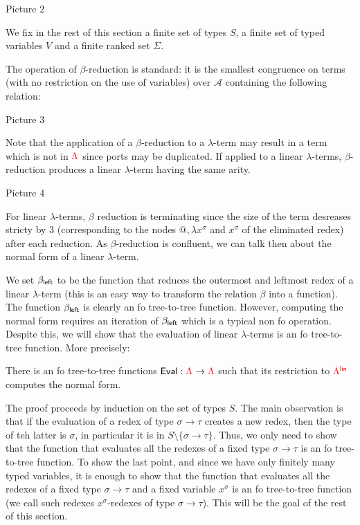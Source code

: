 \begin{center}
Picture 2
\end{center}


We fix in the rest of this section a finite set of types $S$, a finite set of typed variables $V$ and a finite  ranked set $\Sigma$.

 The operation of $\beta$-reduction is standard: it is the smallest congruence on terms (with no restriction on the use of variables) over $\mathcal{A}$ containing the following relation:
 \begin{center}
 Picture 3
 \end{center}
Note that the application of a $\beta$-reduction to a $\lambda$-term may result in a term which is not in ${\color{red}{\Lambda}}$ since ports may be duplicated. If applied to a linear $\lambda$-terms, $\beta$-reduction produces a linear $\lambda$-term having the same arity. 
\begin{center}
Picture 4
\end{center}

\medskip
For linear $\lambda$-terms, $\beta$ reduction is terminating since the size of the term desreases stricty by 3 (corresponding to the nodes $\text{@}, \lambda x^\sigma$ and $x^\sigma$ of the eliminated redex) after each reduction. As $\beta$-reduction is confluent, we can talk then about the normal form of a linear $\lambda$-term.

\medskip
We set $\beta_{\sf{left}}$ to be the function that reduces the outermost and leftmost redex of a linear $\lambda$-term (this is an easy way to transform the relation $\beta$ into a function). The function $\beta_{\sf{left}}$  is clearly an fo tree-to-tree function. However, computing the normal form requires an iteration of $\beta_{\sf{left}}$ which is a typical non fo operation. Despite this, we will show that the evaluation of linear $\lambda$-terms is an fo tree-to-tree function. More precisely:


\begin{theorem}
There is an fo tree-to-tree functions ${\sf{Eval}}:{\color{red}{\Lambda}} \to{\color{red}{\Lambda}}$ such that its restriction to ${\color{red}{\Lambda^{\sf{lin}}}}$ computes the normal form.
\end{theorem}

The proof proceeds by induction on the set of types $S$. The main observation is that if the evaluation of a redex of type $\sigma\rightarrow \tau$ creates a new redex, then the type of teh latter is $\sigma$, in particular it is in $S\setminus\{\sigma\rightarrow\tau\}$. Thus, we only need to show that the function that evaluates all the redexes of a fixed type $\sigma\rightarrow\tau$ is an fo tree-to-tree function.  To show the last point, and since we have only finitely many typed variables, it is enough to show that the function that evaluates all the redexes of a fixed type $\sigma\rightarrow\tau$ and a fixed variable $x^\sigma$ is an fo tree-to-tree function (we call such redexes $x^\sigma$-redexes of type $\sigma\rightarrow\tau$). This will be the goal of the rest of this section. 

